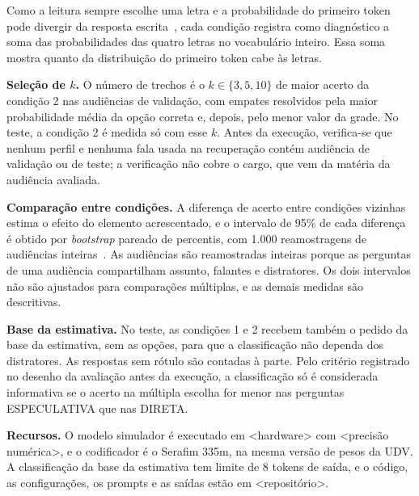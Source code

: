 Como a leitura sempre escolhe uma letra e a probabilidade do primeiro token pode divergir da
resposta escrita~\citep{wang2024answer}, cada condição registra como diagnóstico a soma das
probabilidades das quatro letras no vocabulário inteiro. Essa soma mostra quanto da distribuição do
primeiro token cabe às letras.

\textbf{Seleção de $k$.} O número de trechos é o $k \in \{3, 5, 10\}$ de maior acerto da condição 2
nas audiências de validação, com empates resolvidos pela maior probabilidade média da opção correta
e, depois, pelo menor valor da grade. No teste, a condição 2 é medida só com esse $k$. Antes da
execução, verifica-se que nenhum perfil e nenhuma fala usada na recuperação contém audiência de
validação ou de teste; a verificação não cobre o cargo, que vem da matéria da audiência avaliada.

\textbf{Comparação entre condições.} A diferença de acerto entre condições vizinhas estima o efeito
do elemento acrescentado, e o intervalo de 95\% de cada diferença é obtido por \textit{bootstrap}
pareado de percentis, com 1.000 reamostragens de audiências inteiras~\citep{efron1993introduction}.
As audiências são reamostradas inteiras porque as perguntas de uma audiência compartilham assunto,
falantes e distratores. Os dois intervalos não são ajustados para comparações múltiplas, e as demais
medidas são descritivas.

\textbf{Base da estimativa.} No teste, as condições 1 e 2 recebem também o pedido da base da
estimativa, sem as opções, para que a classificação não dependa dos distratores. As respostas sem
rótulo são contadas à parte. Pelo critério registrado no desenho da avaliação antes da execução, a
classificação só é considerada informativa se o acerto na múltipla escolha for menor nas perguntas
ESPECULATIVA que nas DIRETA.

\textbf{Recursos.} O modelo simulador é executado em <hardware> com <precisão numérica>, e o
codificador é o Serafim 335m, na mesma versão de pesos da UDV. A classificação da base da estimativa
tem limite de 8 tokens de saída, e o código, as configurações, os prompts e as saídas estão em
<repositório>.
